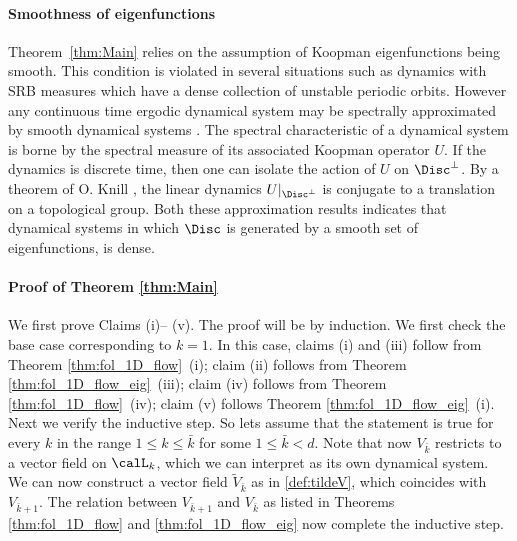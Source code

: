 \documentclass[12pt,oneside]{article}
\begin{document}
\paragraph{Smoothness of eigenfunctions} Theorem~\ref{thm:Main} relies on the assumption of Koopman eigenfunctions being smooth. This condition is violated in several situations such as dynamics with SRB measures which have a dense collection of unstable periodic orbits. However any continuous time ergodic dynamical system may be spectrally approximated by smooth dynamical systems \cite{DGJ_compactV_2018, ValvaGiannakis2023cnstnt}. The spectral characteristic of a dynamical system is borne by the spectral measure of its associated Koopman operator $U$. If the dynamics is discrete time, then one can isolate the action of $U$ on $\Disc^\bot$. By a theorem of O. Knill \citep[][Thm 3.1]{Knill1997}, the linear dynamics $U \rvert_{\Disc^\bot}$ is conjugate to a translation on a topological group. Both these approximation results indicates that dynamical systems in which $\Disc$ is generated by a smooth set of eigenfunctions, is dense.


\paragraph{Proof of Theorem \ref{thm:Main}} 
We first prove Claims (i)-- (v). The proof will be by induction. We first check the base case corresponding to $k=1$. In this case, claims (i) and (iii) follow from Theorem \ref{thm:fol_1D_flow}~(i); claim (ii) follows from Theorem \ref{thm:fol_1D_flow_eig}~(iii); claim (iv) follows from Theorem \ref{thm:fol_1D_flow}~(iv); claim (v) follows Theorem \ref{thm:fol_1D_flow_eig}~(i). Next we verify the inductive step. So lets assume that the statement is true for every $k$ in the range $1\leq k \leq \bar{k}$ for some $1\leq \bar{k}<d$. Note that now $V_{\bar{k}}$ restricts to a vector field on $\calL_k$, which we can interpret as its own dynamical system. We can now construct a vector field $\tilde{V}_{\bar{k}}$ as in \eqref{def:tildeV}, which coincides with $V_{\bar{k}+1}$. The relation between $V_{\bar{k}+1}$ and $V_{\bar{k}}$ as listed in Theorems \ref{thm:fol_1D_flow} and \ref{thm:fol_1D_flow_eig} now complete the inductive step.
\end{document}
